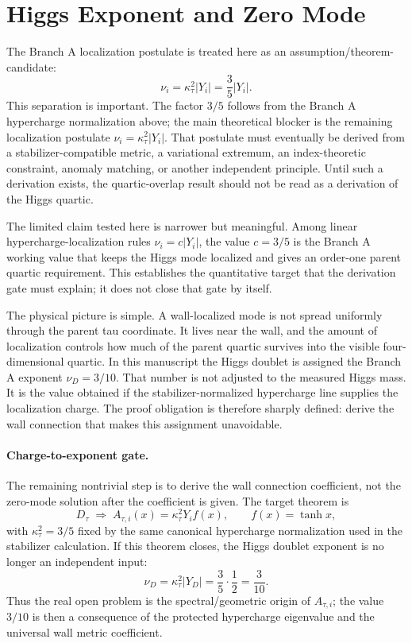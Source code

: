 \documentclass[11pt]{article}
\begin{document}
\section{Higgs Exponent and Zero Mode}
The Branch A localization postulate is treated here as an
assumption/theorem-candidate:
\begin{equation}
\nu_i=\kappa_\tau^2 |Y_i|=\frac35 |Y_i| .
\end{equation}
This separation is important. The factor $3/5$ follows from the Branch A
hypercharge normalization above; the main theoretical blocker is the remaining
localization postulate $\nu_i=\kappa_\tau^2|Y_i|$. That postulate must
eventually be derived from a stabilizer-compatible metric, a variational
extremum, an index-theoretic constraint, anomaly matching, or another
independent principle. Until such a derivation exists, the quartic-overlap
result should not be read as a derivation of the Higgs quartic.

The limited claim tested here is narrower but meaningful. Among linear hypercharge-localization rules $\nu_i=c|Y_i|$, the value $c=3/5$ is the Branch A working value that keeps the Higgs mode localized and gives an order-one parent quartic requirement. This establishes the quantitative target that the derivation gate must explain; it does not close that gate by itself.

The physical picture is simple.  A wall-localized mode is not spread uniformly
through the parent tau coordinate.  It lives near the wall, and the amount of
localization controls how much of the parent quartic survives into the visible
four-dimensional quartic.  In this manuscript the Higgs doublet is assigned the
Branch A exponent $\nu_D=3/10$.  That number is not adjusted to the measured
Higgs mass.  It is the value obtained if the stabilizer-normalized
hypercharge line supplies the localization charge.  The proof obligation is
therefore sharply defined: derive the wall connection that makes this
assignment unavoidable.

\paragraph{Charge-to-exponent gate.}
The remaining nontrivial step is to derive the wall connection coefficient,
not the zero-mode solution after the coefficient is given.  The target theorem
is
\begin{equation}
D_\tau\;\Longrightarrow\;
A_{\tau,i}(x)=\kappa_\tau^2Y_i f(x),
\qquad
f(x)=\tanh x ,
\end{equation}
with $\kappa_\tau^2=3/5$ fixed by the same canonical hypercharge normalization
used in the stabilizer calculation.  If this theorem closes, the Higgs doublet
exponent is no longer an independent input:
\begin{equation}
\nu_D=\kappa_\tau^2|Y_D|=\frac35\cdot\frac12=\frac3{10}.
\end{equation}
Thus the real open problem is the spectral/geometric origin of
$A_{\tau,i}$; the value $3/10$ is then a consequence of the protected
hypercharge eigenvalue and the universal wall metric coefficient.
\end{document}
